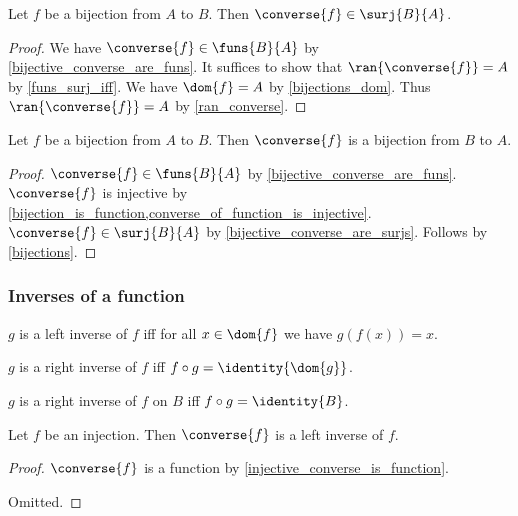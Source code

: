 \begin{proposition}\label{bijective_converse_are_surjs}
    Let $f$ be a bijection from $A$ to $B$.
    Then $\converse{f}\in\surj{B}{A}$.
\end{proposition}
\begin{proof}
    We have $\converse{f}\in\funs{B}{A}$ by \cref{bijective_converse_are_funs}.
    It suffices to show that $\ran{\converse{f}} = A$ by \cref{funs_surj_iff}.
    We have $\dom{f} = A$ by \cref{bijections_dom}.
    Thus $\ran{\converse{f}} = A$ by \cref{ran_converse}.
\end{proof}

\begin{proposition}\label{bijection_converse_is_bijection}
    Let $f$ be a bijection from $A$ to $B$.
    Then $\converse{f}$ is a bijection from $B$ to $A$.
\end{proposition}
\begin{proof}
    $\converse{f}\in\funs{B}{A}$ by \cref{bijective_converse_are_funs}.
    $\converse{f}$ is injective by \cref{bijection_is_function,converse_of_function_is_injective}.
    $\converse{f}\in\surj{B}{A}$ by \cref{bijective_converse_are_surjs}.
    Follows by \cref{bijections}.
\end{proof}

\subsubsection{Inverses of a function}

\begin{abbreviation}\label{leftinverse}
    $g$ is a left inverse of $f$ iff for all $x\in\dom{f}$ we have $g(f(x)) = x$.
\end{abbreviation}

\begin{abbreviation}\label{rightinverse}
    $g$ is a right inverse of $f$ iff $f\circ g = \identity{\dom{g}}$.
\end{abbreviation}

\begin{abbreviation}\label{rightinverseon}
    $g$ is a right inverse of $f$ on $B$ iff $f\circ g = \identity{B}$.
\end{abbreviation}

\begin{proposition}\label{injective_converse_is_leftinverse}
    Let $f$ be an injection.
    Then $\converse{f}$ is a left inverse of $f$.
\end{proposition}
\begin{proof}
    $\converse{f}$ is a function by \cref{injective_converse_is_function}.

    Omitted. %
\end{proof}



